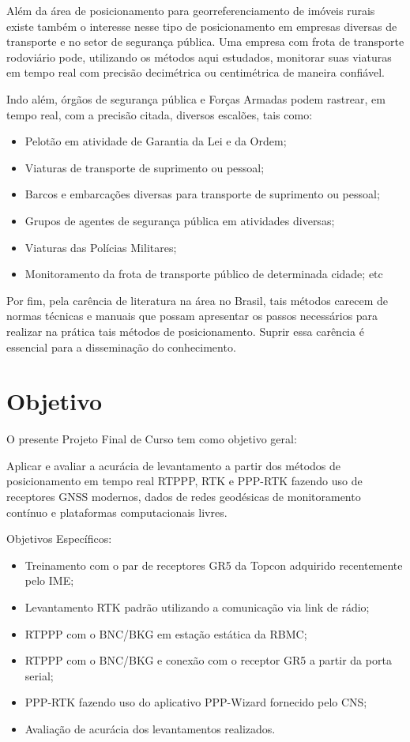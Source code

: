 Além da área de posicionamento para georreferenciamento de imóveis rurais existe também o interesse nesse tipo de posicionamento em empresas diversas de transporte e no setor de segurança pública. Uma empresa com frota de transporte rodoviário pode, utilizando os métodos aqui estudados, monitorar suas viaturas em tempo real com precisão decimétrica ou centimétrica de maneira confiável.

Indo além, órgãos de segurança pública e Forças Armadas podem rastrear, em tempo real, com a precisão citada, diversos escalões, tais como:
\begin{itemize}
    \item Pelotão em atividade de Garantia da Lei e da Ordem;
    \item Viaturas de transporte de suprimento ou pessoal;
    \item Barcos e embarcações diversas para transporte de suprimento ou pessoal;
    \item Grupos de agentes de segurança pública em atividades diversas;
    \item Viaturas das Polícias Militares;
    \item Monitoramento da frota de transporte público de determinada cidade; etc
\end{itemize}

Por fim, pela carência de literatura na área no Brasil, tais métodos carecem de normas técnicas e manuais que possam apresentar os passos necessários para realizar na prática tais métodos de posicionamento. Suprir essa carência é essencial para a disseminação do conhecimento. 


\section{Objetivo}
\noindent
O presente Projeto Final de Curso tem como objetivo geral:

Aplicar e avaliar a acurácia de levantamento a partir dos métodos de posicionamento em tempo real RTPPP, RTK e PPP-RTK fazendo uso de receptores GNSS modernos, dados de redes geodésicas de monitoramento contínuo e plataformas computacionais livres.


Objetivos Específicos:

\begin{itemize}
    \item Treinamento com o par de receptores GR5 da Topcon adquirido recentemente pelo IME;
    \item Levantamento RTK padrão utilizando a comunicação via link de rádio;
    \item RTPPP com o BNC/BKG em estação estática da RBMC;
    \item RTPPP com o BNC/BKG e conexão com o receptor GR5 a partir da porta serial;
    \item PPP-RTK fazendo uso do aplicativo PPP-Wizard fornecido pelo CNS;
    \item Avaliação de acurácia dos levantamentos realizados.
\end{itemize}


